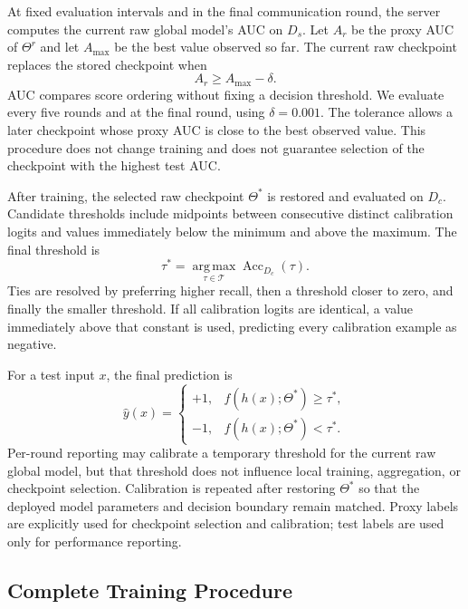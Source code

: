 \documentclass[lettersize,journal]{IEEEtran}
\begin{document}
At fixed evaluation intervals and in the final communication round, the server computes the current raw global model's AUC on $D_s$. Let $A_r$ be the proxy AUC of $\Theta^r$ and let $A_{\max}$ be the best value observed so far. The current raw checkpoint replaces the stored checkpoint when
\begin{equation}
A_r\geq A_{\max}-\delta.
\label{eq:checkpoint-rule}
\end{equation}
AUC compares score ordering without fixing a decision threshold. We evaluate every five rounds and at the final round, using $\delta=0.001$. The tolerance allows a later checkpoint whose proxy AUC is close to the best observed value. This procedure does not change training and does not guarantee selection of the checkpoint with the highest test AUC.

After training, the selected raw checkpoint $\Theta^*$ is restored and evaluated on $D_c$. Candidate thresholds include midpoints between consecutive distinct calibration logits and values immediately below the minimum and above the maximum. The final threshold is
\begin{equation}
\tau^*=\underset{\tau\in\mathcal T}{\operatorname{arg\,max}}
\operatorname{Acc}_{D_c}(\tau).
\label{eq:threshold}
\end{equation}
Ties are resolved by preferring higher recall, then a threshold closer to zero, and finally the smaller threshold. If all calibration logits are identical, a value immediately above that constant is used, predicting every calibration example as negative.

For a test input $x$, the final prediction is
\begin{equation}
\widehat y(x)=
\begin{cases}
+1,&f(h(x);\Theta^*)\geq\tau^*,\\
-1,&f(h(x);\Theta^*)<\tau^*.
\end{cases}
\label{eq:prediction}
\end{equation}
Per-round reporting may calibrate a temporary threshold for the current raw global model, but that threshold does not influence local training, aggregation, or checkpoint selection. Calibration is repeated after restoring $\Theta^*$ so that the deployed model parameters and decision boundary remain matched. Proxy labels are explicitly used for checkpoint selection and calibration; test labels are used only for performance reporting.

\subsection{Complete Training Procedure}
\end{document}
